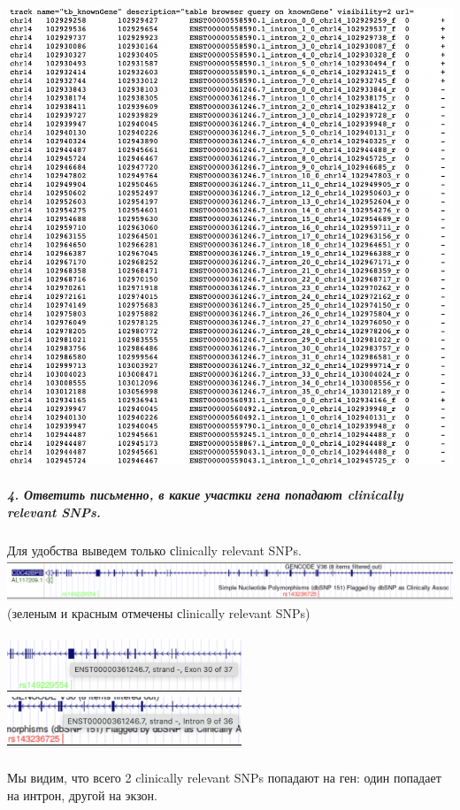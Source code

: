 \documentclass[12pt]{article}
\begin{document}
\includegraphics[width=15cm]{image/image15.png}
\newpage

\subparagraph{4. Ответить письменно, в какие участки гена попадают clinically relevant SNPs.\\}
Для удобства выведем только сlinically relevant SNPs.\\
\includegraphics[width=15cm]{image/image16.png}\\
(зеленым и красным отмечены сlinically relevant SNPs)\\\\
\includegraphics[width=7cm]{image/image17.png}
\includegraphics[width=7cm]{image/image18.png}\\\\
Мы видим, что всего 2 clinically relevant SNPs попадают на ген: один попадает на интрон, другой на экзон.
\end{document}
